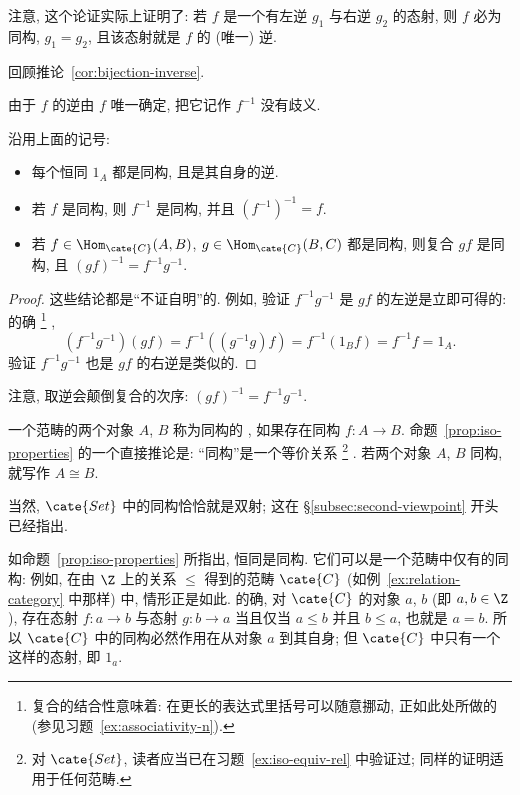 注意, 这个论证实际上证明了: 若 $f$ 是一个有左逆 $g_1$ 与右逆 $g_2$ 的态射, 则 $f$ 必为同构, $g_1 = g_2$, 且该态射就是 $f$ 的 (唯一) 逆.

回顾推论~\ref{cor:bijection-inverse}.

由于 $f$ 的逆由 $f$ 唯一确定, 把它记作 $f^{-1}$ 没有歧义.

\begin{proposition}
\label{prop:iso-properties}
沿用上面的记号:
\begin{itemize}
	\item 每个恒同 $1_A$ 都是同构, 且是其自身的逆.
	\item 若 $f$ 是同构, 则 $f^{-1}$ 是同构, 并且 $(f^{-1})^{-1} = f$.
	\item 若 $f \in \Hom_{\cate{C}}(A, B)$, $g \in \Hom_{\cate{C}}(B, C)$ 都是同构, 则复合 $gf$ 是同构, 且 $(gf)^{-1} = f^{-1} g^{-1}$.
\end{itemize}
\end{proposition}

\begin{proof}
这些结论都是``不证自明''的. 例如, 验证 $f^{-1} g^{-1}$ 是 $gf$ 的左逆是立即可得的: 的确%
\footnote{复合的结合性意味着: 在更长的表达式里括号可以随意挪动, 正如此处所做的 (参见习题~\ref{ex:associativity-n}).}%
,
\[
(f^{-1} g^{-1})(g f) = f^{-1} ((g^{-1} g) f) = f^{-1} (1_B f) = f^{-1} f = 1_A.
\]
验证 $f^{-1} g^{-1}$ 也是 $gf$ 的右逆是类似的.
\end{proof}

注意, 取逆会颠倒复合的次序: $(gf)^{-1} = f^{-1} g^{-1}$.

一个范畴的两个对象 $A$, $B$ 称为同构的%
, 如果存在同构 $f : A \to B$. 命题~\ref{prop:iso-properties} 的一个直接推论是: ``同构''是一个等价关系%
\footnote{对 $\cate{Set}$, 读者应当已在习题~\ref{ex:iso-equiv-rel} 中验证过; 同样的证明适用于任何范畴.}%
. 若两个对象 $A$, $B$ 同构, 就写作 $A \cong B$.

\begin{example}
\label{ex:iso-in-set}
当然, $\cate{Set}$ 中的同构恰恰就是双射; 这在 \S\ref{subsec:second-viewpoint} 开头已经指出.
\end{example}

\begin{example}
\label{ex:iso-identities}
如命题~\ref{prop:iso-properties} 所指出, 恒同是同构. 它们可以是一个范畴中仅有的同构: 例如, 在由 $\Z$ 上的关系 $\leq$ 得到的范畴 $\cate{C}$ (如例~\ref{ex:relation-category} 中那样) 中, 情形正是如此. 的确, 对 $\cate{C}$ 的对象 $a$, $b$ (即 $a, b \in \Z$), 存在态射 $f : a \to b$ 与态射 $g : b \to a$ 当且仅当 $a \leq b$ 并且 $b \leq a$, 也就是 $a = b$. 所以 $\cate{C}$ 中的同构必然作用在从对象 $a$ 到其自身; 但 $\cate{C}$ 中只有一个这样的态射, 即 $1_a$.
\end{example}


